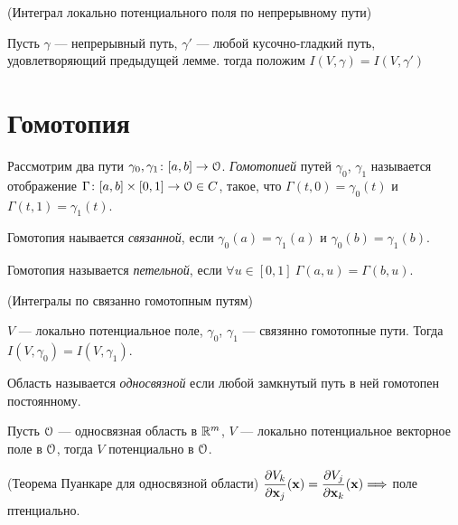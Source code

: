 \begin{definition}(Интеграл локально потенциального поля по непрерывному пути)

    Пусть $\gamma$ --- непрерывный путь, $\gamma'$ --- любой кусочно-гладкий путь,
    удовлетворяющий предыдущей лемме. тогда положим $I(V, \gamma) = I(V, \gamma')$
\end{definition}


\section{Гомотопия}

\begin{definition}
    Рассмотрим два пути $\gamma_0, \gamma_1 \colon [a, b] \to \mathcal{O}$.
    \textit{Гомотопией} путей $\gamma_0$, $\gamma_1$ называется отображение $\Gamma
    \colon [a, b] \times [0, 1] \to \mathcal{O} \in C$, такое, что $\Gamma(t, 0) =
    \gamma_0(t)$ и $\Gamma(t, 1) = \gamma_1(t)$.
\end{definition}

\begin{definition}
    Гомотопия наывается \textit{связанной}, если $\gamma_0(a) = \gamma_1(a)$ и
    $\gamma_0(b) = \gamma_1(b)$.
\end{definition}

\begin{definition}
    Гомотопия называется \textit{петельной}, если $\forall u \in [0, 1]~
    \Gamma(a, u) = \Gamma(b, u)$.
\end{definition}

\begin{theorem}(Интегралы по связанно гомотопным путям)

    $V$ --- локально потенциальное поле, $\gamma_0$, $\gamma_1$ --- связянно
    гомотопные пути. Тогда $I(V, \gamma_0) = I(V, \gamma_1)$.
\end{theorem}

\begin{definition}
    Область называется \textit{односвязной} если любой замкнутый путь в ней
    гомотопен постоянному.
\end{definition}

\begin{theorem}

    Пусть $\mathcal{O}$ --- односвязная область в $\mathbb{R}^m$, $V$ --- локально потенциальное
    векторное поле в $\mathcal{O}$, тогда $V$ потенциально в $\mathcal{O}$.
\end{theorem}

\begin{corollary}(Теорема Пуанкаре для односвязной области)
    $\dfrac{\partial V_k}{\partial \mathbf{x}_j}(\mathbf{x}) = \dfrac{\partial V_j}{\partial \mathbf{x}_k}(\mathbf{x}) \Longrightarrow$ поле птенциально.
\end{corollary}
